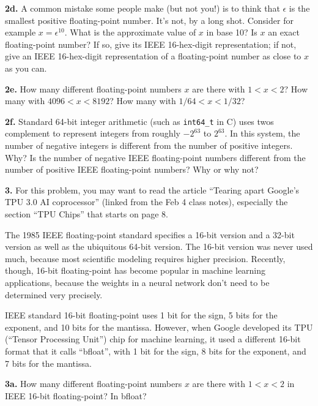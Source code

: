 \documentclass[11pt]{article}
\begin{document}
\par\medskip
{\bf 2d.}
A common mistake some people make (but not you!) is to think that $\epsilon$ is
the smallest positive floating-point number. It's not, by a long shot. Consider
for example $x = \epsilon^{10}$. What is the approximate value of $x$ in base 10?
Is $x$ an exact floating-point number? If so, give its IEEE 16-hex-digit representation;
if not, give an IEEE 16-hex-digit representation of a floating-point number as
close to $x$ as you can.

\par\medskip 
{\bf 2e.}
How many different floating-point numbers $x$ are there with $1 < x < 2$?
How many with $4096 < x < 8192$?  How many with $1/64 < x < 1/32$?

\par\medskip
{\bf 2f.}
Standard 64-bit integer arithmetic (such as {\tt int64\_t} in C) uses
twos complement to represent integers from roughly $-2^{63}$ to $2^{63}$.
In this system, the number of negative integers is different from the number of
positive integers. Why? Is the number of negative IEEE floating-point numbers
different from the number of positive IEEE floating-point numbers? 
Why or why not?

\par\bigskip
{\bf 3.}
For this problem, you may want to read the article 
``Tearing apart Google's TPU 3.0 AI coprocessor'' 
(linked from the Feb 4 class notes),
especially the section ``TPU Chips'' that starts on page 8.

The 1985 IEEE floating-point standard specifies a 16-bit version 
and a 32-bit version as well as the ubiquitous 64-bit version.
The 16-bit version was never used much, 
because most scientific modeling requires higher precision. 
Recently, though, 
16-bit floating-point has become popular in machine learning applications,
because the weights in a neural network don't need to be determined very precisely.

IEEE standard 16-bit floating-point uses 1 bit for the sign, 5 bits for 
the exponent, and 10 bits for the mantissa. 
However, when Google developed its TPU (``Tensor Processing Unit'') chip
for machine learning, it used a different 16-bit format that it calls
``bfloat'', with 1 bit for the sign, 8 bits for the exponent, and 7 bits for the mantissa.

\par\medskip
{\bf 3a.}
How many different floating-point numbers $x$ are there with $1 < x < 2$
in IEEE 16-bit floating-point? In bfloat?
\end{document}

